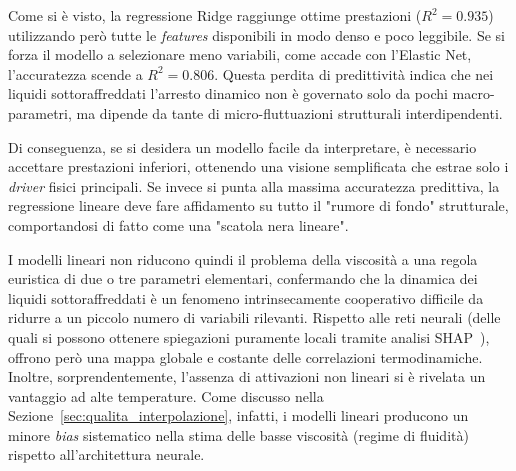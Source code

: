 \documentclass[../main.tex]{subfiles}
\begin{document}
	Come si è visto, la regressione Ridge raggiunge ottime prestazioni ($R^2 = 0.935$) utilizzando però tutte le \textit{features} disponibili in modo denso e poco leggibile. Se si forza il modello a selezionare meno variabili, come accade con l'Elastic Net, l'accuratezza scende a $R^2 = 0.806$. Questa perdita di predittività indica che nei liquidi sottoraffreddati l'arresto dinamico non è governato solo da pochi macro-parametri, ma dipende da tante di micro-fluttuazioni strutturali interdipendenti.
	
	Di conseguenza, se si desidera un modello facile da interpretare, è necessario accettare prestazioni inferiori, ottenendo una visione semplificata che estrae solo i \textit{driver} fisici principali. Se invece si punta alla massima accuratezza predittiva, la regressione lineare deve fare affidamento su tutto il "rumore di fondo" strutturale, comportandosi di fatto come una "scatola nera lineare".
	
	I modelli lineari non riducono quindi il problema della viscosità a una regola euristica di due o tre parametri elementari, confermando che la dinamica dei liquidi sottoraffreddati è un fenomeno intrinsecamente cooperativo difficile da ridurre a un piccolo numero di variabili rilevanti. Rispetto alle reti neurali (delle quali si possono ottenere spiegazioni puramente locali tramite analisi SHAP~\cite{lundbergUnifiedApproachInterpreting2017}), offrono però una mappa globale e costante delle correlazioni termodinamiche.
	Inoltre, sorprendentemente, l'assenza di attivazioni non lineari si è rivelata un vantaggio ad alte temperature. Come discusso nella Sezione~\ref{sec:qualita_interpolazione}, infatti, i modelli lineari producono un minore \textit{bias} sistematico nella stima delle basse viscosità (regime di fluidità) rispetto all'architettura neurale.
\end{document}
